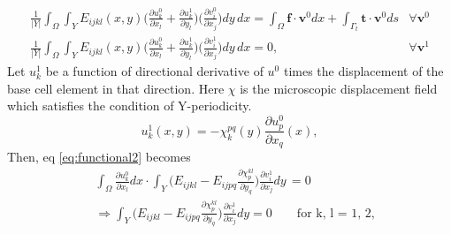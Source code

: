 \documentclass[openright,twoside]{iitkthesis}
\begin{document}
\begin{eqnarray}
\label{eq:functional1}
\frac{1}{|Y|}\int_\Omega\int_Y E_{ijkl}(x,y)\bigg (\frac{\partial u_{k}^0}{\partial x_l}+\frac{\partial u_{k}^1}{\partial y_l}\bigg )\bigg (\frac{\partial v_{i}^0}{\partial x_j}\bigg ) dy\,dx = \int_\Omega\textbf{f}\cdot\textbf{v}^0 dx + \int_{\Gamma_t}\textbf{t}\cdot\textbf{v}^0 ds &\forall \textbf{v}^0\\
\label{eq:functional2}
\frac{1}{|Y|}\int_\Omega\int_Y E_{ijkl}(x,y)\bigg (\frac{\partial u_{k}^0}{\partial x_l}+\frac{\partial u_{k}^1}{\partial y_l}\bigg )\bigg (\frac{\partial v_{i}^1}{\partial x_j}\bigg ) dy\,dx = 0,  &\forall \textbf{v}^1
\end{eqnarray}
Let $u_{k}^1$ be a function of directional derivative of $u^0$ times the displacement of the base cell element in that direction. Here $\chi$ is the microscopic displacement field which satisfies the condition of Y-periodicity.
\begin{equation}\label{localization}
u_{k}^1(x,y)=-\chi^{pq}_k(y)\frac{\partial u_{p}^0}{\partial x_q}(x),
\end{equation}
Then, eq \eqref{eq:functional2} becomes
\begin{align}
&\int_\Omega\frac{\partial u_{k}^0}{\partial x_l}dx\cdot\int_Y \bigg (E_{ijkl}-E_{ijpq}\frac{\partial \chi^{kl}_p}{\partial y_q}\bigg )\frac{\partial v_{i}^1}{\partial x_j} dy\,=0\\
\label{eq:homogenized1}
&\Rightarrow \int_Y \bigg (E_{ijkl}-E_{ijpq}\frac{\partial \chi^{kl}_p}{\partial y_q}\bigg )\frac{\partial v_{i}^1}{\partial x_j} dy=0  \qquad \text{for k, l = 1, 2,}
\end{align}
\end{document}
